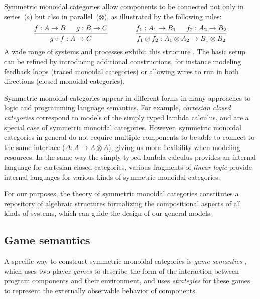 \documentclass[11pt,oneside,draft]{book}
\theoremstyle{definition}
\begin{document}
Symmetric monoidal categories
allow components to be connected
not only in series~($\circ$)
but also in parallel~($\otimes$),
as illustrated by the following rules:
\[
  \begin{prooftree}
    \hypo{f : A \rightarrow B}
    \hypo{g : B \rightarrow C}
    \infer2{g \circ f : A \rightarrow C}
  \end{prooftree}
  \qquad
  \qquad
  \begin{prooftree}
    \hypo{f_1 : A_1 \rightarrow B_1}
    \hypo{f_2 : A_2 \rightarrow B_2}
    \infer2{f_1 \otimes f_2 : A_1 \otimes A_2 \rightarrow B_1 \otimes B_2}
  \end{prooftree}
\]
A wide range of systems and processes
exhibit this structure \citep{rosetta}.
The basic setup can be refined by introducing additional constructions,
for instance modeling
feedback loops (traced monoidal categories) or allowing
wires to run in both directions
(closed monoidal categories).

Symmetric monoidal categories appear in different forms
in many approaches to logic and programming language semantics.
For example,
\emph{cartesian closed categories}
correspond
to models of the simply typed lambda calculus,
and are a special case of symmetric monoidal categories.
However,
symmetric monoidal categories in general do not require
multiple components to be able to connect to the same interface
($\Delta : A \rightarrow A \otimes A$),
giving us more flexibility when modeling resources.
In the same way the simply-typed lambda calculus provides
an internal language for cartesian closed categories,
various fragments of \emph{linear logic} provide
internal languages for various kinds of symmetric monoidal categories.

For our purposes,
the theory of symmetric monoidal categories
constitutes a repository of algebraic structures
formalizing the compositional aspects of
all kinds of systems,
which can guide the design
of our general models.


\subsection{Game semantics} %

A specific way to construct symmetric monoidal categories
is \emph{game semantics} \citep{cspgs},
which uses two-player \emph{games} to describe
the form of the interaction between
program components and their environment,
and uses \emph{strategies} for these games
to represent the externally observable behavior
of components.
\end{document}
